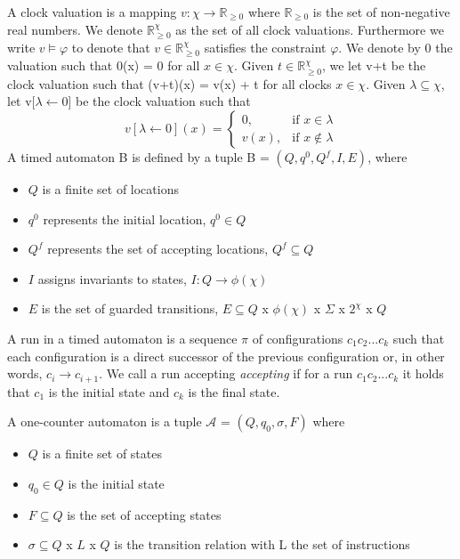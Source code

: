 \documentclass[12pt]{article}
\begin{document}
A clock valuation is a mapping $v:\chi \rightarrow \mathbb{R}_{\geq 0}$ where $\mathbb{R}_{\geq 0}$ is the set of non-negative real numbers. We denote $\mathbb{R}^{\chi}_{\geq 0}$ as the set of all clock valuations. Furthermore we write $v \models \varphi$ to denote that $v \in \mathbb{R}^{\chi}_{\geq 0}$ satisfies the constraint $\varphi$. We denote by 0 the valuation such that 0(x) = 0 for all $x \in \chi$. Given $t \in \mathbb{R}^{\chi}_{\geq 0}$, we let v+t be the clock valuation such that (v+t)(x) = v(x) + t for all clocks $x \in \chi$. Given $\lambda \subseteq \chi$, let v[$\lambda \leftarrow 0$] be the clock valuation such that
\[
	v[\lambda \leftarrow 0](x) = 
	\begin{cases}
		0,& \text{if } x \in \lambda\\
		v(x),& \text{if } x \notin \lambda
	\end{cases}
\]
A timed automaton B is defined by a tuple B = $(Q, q^0, Q^f, I, E)$, where
\begin{itemize}
	\item $Q$ is a finite set of locations
	\item $q^0$ represents the initial location, $q^0 \in Q$
	\item $Q^f$ represents the set of accepting locations, $Q^f \subseteq Q$
	\item $I$ assigns invariants to states, $I: Q \rightarrow \phi(\chi)$
	\item $E$ is the set of guarded transitions, $E \subseteq Q$ x $\phi(\chi)$ x $\Sigma$ x $2^\chi$ x $Q$
\end{itemize}

A run in a timed automaton is a sequence $\pi$ of configurations $c_1c_2 ... c_k$ such that each configuration is a direct successor of the previous configuration or, in other words, $c_i \rightarrow c_{i+1}$. We call a run accepting \textsl{accepting} if for a run $c_1c_2...c_k$ it holds that $c_1$ is the initial state and $c_k$ is the final state.

A one-counter automaton is a tuple $\mathcal{A}$ = $(Q, q_0, \sigma, F)$ where
\begin{itemize}
	\item $Q$ is a finite set of states
	\item $q_0 \in Q$ is the initial state
	\item $F \subseteq Q$ is the set of accepting states
	\item $\sigma \subseteq Q $ x $ L $ x $ Q $ is the transition relation with L the set of instructions
\end{itemize}
\end{document}
